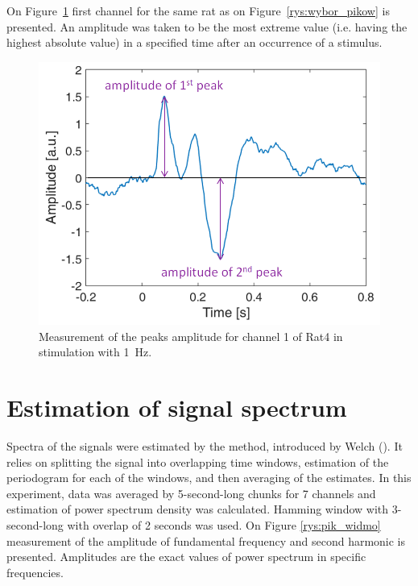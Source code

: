 \documentclass{pracalicmgr}
\begin{document}
    On Figure~\ref{rys:amplitude} first channel for the same rat as on Figure~\ref{rys:wybor_pikow} is presented. An amplitude was taken to be the most extreme value (i.e. having the highest absolute value) in a specified time after an occurrence of a stimulus.
    \begin{figure}[H]
    	\begin{center}
    		\includegraphics[scale=0.5]{amplitude2.png}
    	\end{center}
    	\caption{Measurement of the peaks amplitude for channel 1 of Rat4 in stimulation with 1~Hz. }
    	\label{rys:amplitude}
    \end{figure} 


	\section{Estimation of signal spectrum}
	Spectra of the signals were estimated by the method, introduced by Welch (\cite{welch}). It relies  on splitting the signal into overlapping time windows, estimation of the periodogram for each of the windows, and then averaging of the estimates. In this experiment, data was averaged by 5-second-long chunks for 7 channels and estimation of power spectrum density was calculated. Hamming window with 3-second-long with overlap of 2 seconds was used. On Figure \ref{rys:pik_widmo} measurement of the amplitude of fundamental frequency and second harmonic is presented. Amplitudes are the exact values of power spectrum in specific frequencies. 
\end{document}
